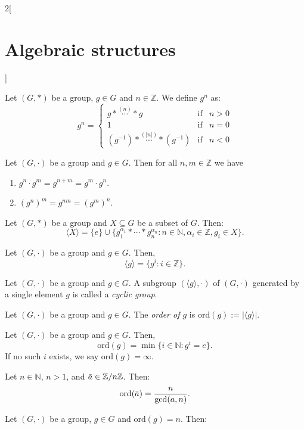 \documentclass[../../../main.tex]{subfiles}
\begin{document}
\begin{multicols}{2}[\section{Algebraic structures}]
\begin{definition}
    Let $(G,*)$ be a group, $g\in G$ and $n\in\mathbb{Z}$. We define $g^n$ as: 
    $$g^n=\left\{
    \begin{array}{lll}
        g*\overset{(n)}{\cdots}* g & \text{if} & n>0  \\
        1 & \text{if} & n=0  \\
        (g^{-1})*\overset{(|n|)}{\cdots}*(g^{-1}) & \text{if} & n<0 
    \end{array}\right.$$
\end{definition}
\begin{lemma}
    Let $(G,\cdot)$ be a group and $g\in G$. Then for all $n,m\in\mathbb{Z}$ we have
    \begin{enumerate}
        \item $g^n\cdot g^m=g^{n+m}=g^m\cdot g^n$.
        \item $(g^n)^m=g^{nm}=(g^m)^n$.
    \end{enumerate}
\end{lemma}
\begin{prop}
    Let $(G,*)$ be a group and $X\subseteq G$ be a subset of $G$. Then: $$\langle X\rangle=\{e\}\cup\{g_1^{\alpha_1}*\cdots* g_n^{\alpha_n}:n\in\mathbb{N},\alpha_i\in\mathbb{Z},g_i\in X\}.$$
\end{prop}
\begin{corollary}
    Let $(G,\cdot)$ be a group and $g\in G$. Then, $$\langle g\rangle=\{g^i:i\in\mathbb{Z}\}.$$
\end{corollary}
\begin{definition}
    Let $(G,\cdot)$ be a group and $g\in G$. A subgroup $(\langle g\rangle,\cdot)$ of $(G,\cdot)$ generated by a single element $g$ is called a \textit{cyclic group}.
\end{definition}
\begin{definition}
    Let $(G,\cdot)$ be a group and $g\in G$. The \textit{order of $g$} is $\text{ord}(g):=|\langle g\rangle|$.
\end{definition}
\begin{prop}
    Let $(G,\cdot)$ be a group and $g\in G$. Then, $$\text{ord}(g)=\min\{i\in\mathbb{N}:g^i=e\}.$$ If no such $i$ exists, we say $\text{ord}(g)=\infty$.
\end{prop}
\begin{corollary}
    Let $n\in\mathbb{N}$, $n>1$, and $\Bar{a}\in\mathbb{Z}/n\mathbb{Z}$. Then: $$\text{ord}(\Bar{a})=\frac{n}{\gcd(a,n)}.$$
\end{corollary}
\begin{lemma}
    Let $(G,\cdot)$ be a group, $g\in G$ and $\text{ord}(g)=n$. Then:

\end{lemma}
\end{multicols}
\end{document}
